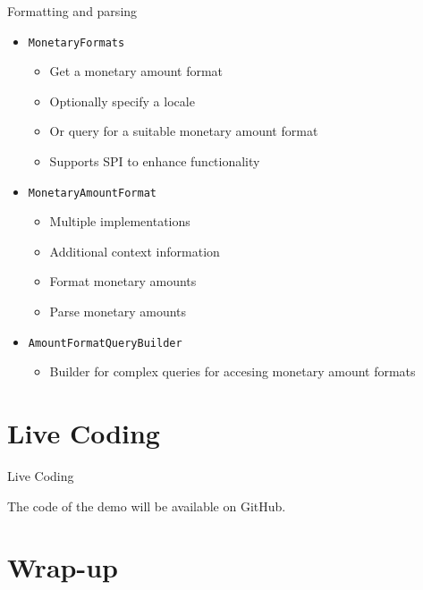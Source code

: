 \documentclass{beamer}
\newcommand{\code}[1]{\texttt{#1}}
\newcommand{\slideItems}[1]{
	\begin{itemize}
		#1
	\end{itemize}
}
\newcommand{\slide}[2]{
	\begin{frame}{#1}
		#2
	\end{frame}
}
\begin{document}
\slide{Formatting and parsing}{
	\slideItems{
		\item \code{MonetaryFormats}
			\slideItems{
				\item Get a monetary amount format
				\item Optionally specify a locale
				\item Or query for a suitable monetary amount format
				\item Supports SPI to enhance functionality
			}
		\item \code{MonetaryAmountFormat}
			\slideItems{
				\item Multiple implementations
				\item Additional context information
				\item Format monetary amounts
				\item Parse monetary amounts
			}
		\item \code{AmountFormatQueryBuilder}
			\slideItems{
				\item Builder for complex queries for accesing monetary amount formats
			}
	}
}

\section{Live Coding}

\slide{}{
	\begin{center}
		\huge{Live Coding}
	
		\large{The code of the demo will be available on GitHub.}
	\end{center}
}

\section{Wrap-up}
\end{document}
